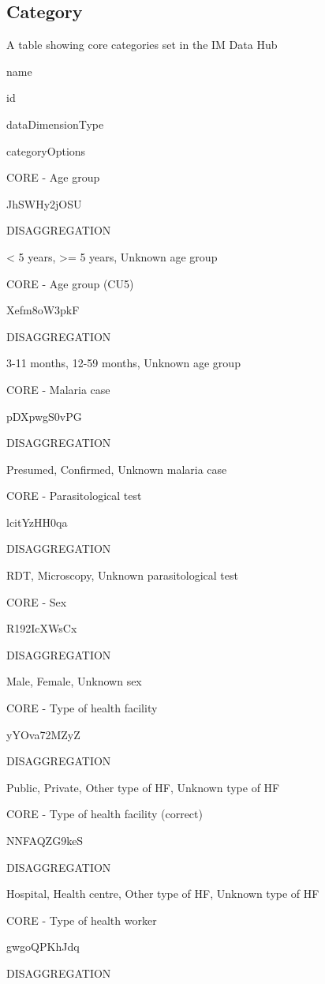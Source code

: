 \documentclass[]{book}
\begin{document}
\hypertarget{category}{%
\subsection{Category}\label{category}}

\label{tab:unnamed-chunk-15}A table showing core categories set in the IM Data Hub

name

id

dataDimensionType

categoryOptions

CORE - Age group

JhSWHy2jOSU

DISAGGREGATION

\textless{} 5 years, \textgreater{}= 5 years, Unknown age group

CORE - Age group (CU5)

Xefm8oW3pkF

DISAGGREGATION

3-11 months, 12-59 months, Unknown age group

CORE - Malaria case

pDXpwgS0vPG

DISAGGREGATION

Presumed, Confirmed, Unknown malaria case

CORE - Parasitological test

lcitYzHH0qa

DISAGGREGATION

RDT, Microscopy, Unknown parasitological test

CORE - Sex

R192IcXWsCx

DISAGGREGATION

Male, Female, Unknown sex

CORE - Type of health facility

yYOva72MZyZ

DISAGGREGATION

Public, Private, Other type of HF, Unknown type of HF

CORE - Type of health facility (correct)

NNFAQZG9keS

DISAGGREGATION

Hospital, Health centre, Other type of HF, Unknown type of HF

CORE - Type of health worker

gwgoQPKhJdq

DISAGGREGATION
\end{document}
